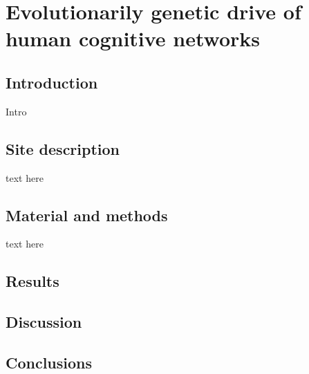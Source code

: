 \pagestyle{MyStyle}

\chapter[First paper...]{Evolutionarily genetic drive of human cognitive networks}
\label{ch:firstpaper}

\section{Introduction}
\label{sec:intro1}
 Intro

\section{Site description}
 text here

\section{Material and methods}
 text here

\section{Results}

\section{Discussion}

\section{Conclusions}


